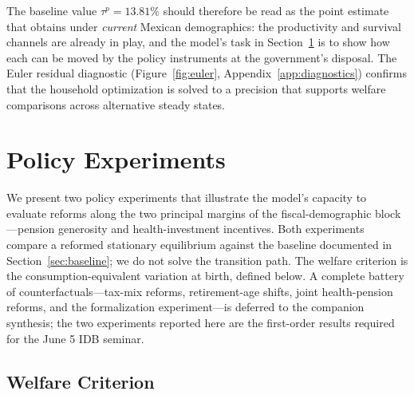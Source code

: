 \documentclass[12pt,a4paper]{article}
\begin{document}
The baseline value $\tau^{p} = 13.81\%$ should therefore be read as
the point estimate that obtains under \emph{current} Mexican
demographics: the productivity and survival channels are already in
play, and the model's task in Section~\ref{sec:experiments} is to
show how each can be moved by the policy instruments at the
government's disposal. The Euler residual diagnostic
(Figure~\ref{fig:euler}, Appendix~\ref{app:diagnostics}) confirms that
the household optimization is solved to a precision that supports
welfare comparisons across alternative steady states.

\section{Policy Experiments}
\label{sec:experiments}

We present two policy experiments that illustrate the model's
capacity to evaluate reforms along the two principal margins of the
fiscal-demographic block---pension generosity and health-investment
incentives. Both experiments compare a reformed stationary
equilibrium against the baseline documented in
Section~\ref{sec:baseline}; we do not solve the transition path. The
welfare criterion is the consumption-equivalent variation at birth,
defined below. A complete battery of counterfactuals---tax-mix
reforms, retirement-age shifts, joint health-pension reforms, and the
formalization experiment---is deferred to the companion synthesis;
the two experiments reported here are the first-order results
required for the June 5 IDB seminar.

\subsection{Welfare Criterion}
\label{subsec:welfare}
\end{document}
